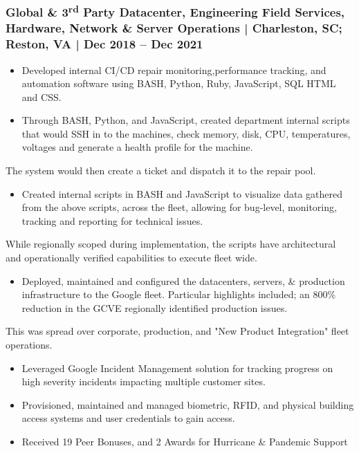 \documentclass[letter,10pt]{article}
\begin{document}
\subsubsection*{Global \& 3\textsuperscript{rd} Party Datacenter, Engineering Field Services, Hardware, Network \& Server Operations | Charleston, SC; Reston, VA | Dec 2018 – Dec 2021}
\label{sec:org1d24701}
\begin{itemize}
\item Developed internal CI/CD repair monitoring,performance tracking, and automation software using BASH, Python, Ruby, JavaScript, SQL HTML and CSS.
\item Through BASH, Python, and JavaScript, created department internal scripts that would SSH in to the machines, check memory, disk, CPU, temperatures, voltages and generate a health profile for the machine.
\end{itemize}
The system would then create a ticket and dispatch it to the repair pool.
\begin{itemize}
\item Created internal scripts in BASH and JavaScript to visualize data gathered from the above scripts, across the fleet, allowing for bug-level, monitoring, tracking and reporting for technical issues.
\end{itemize}
While regionally scoped during implementation, the scripts have architectural and operationally verified capabilities to execute fleet wide. 
\begin{itemize}
\item Deployed, maintained and configured the datacenters, servers, \& production infrastructure to the Google fleet. Particular highlights included; an 800\% reduction in the GCVE regionally identified production issues.
\end{itemize}
This was spread over corporate, production, and "New Product Integration" fleet operations. 
\begin{itemize}
\item Leveraged Google Incident Management solution for tracking progress on high severity incidents impacting multiple customer sites.
\item Provisioned, maintained and managed biometric, RFID, and physical building access systems and user credentials to gain access.
\item Received 19 Peer Bonuses, and 2 Awards for Hurricane \& Pandemic Support
\end{itemize}
\end{document}

